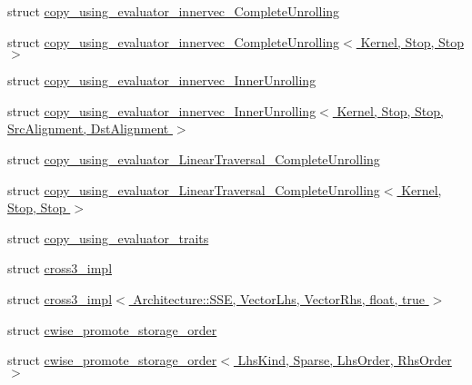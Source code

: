 \begin{DoxyCompactItemize}
\item 
struct \hyperlink{struct_eigen_1_1internal_1_1copy__using__evaluator__innervec___complete_unrolling}{copy\+\_\+using\+\_\+evaluator\+\_\+innervec\+\_\+\+Complete\+Unrolling}
\item 
struct \hyperlink{struct_eigen_1_1internal_1_1copy__using__evaluator__innervec___complete_unrolling_3_01_kernel_00_01_stop_00_01_stop_01_4}{copy\+\_\+using\+\_\+evaluator\+\_\+innervec\+\_\+\+Complete\+Unrolling$<$ Kernel, Stop, Stop $>$}
\item 
struct \hyperlink{struct_eigen_1_1internal_1_1copy__using__evaluator__innervec___inner_unrolling}{copy\+\_\+using\+\_\+evaluator\+\_\+innervec\+\_\+\+Inner\+Unrolling}
\item 
struct \hyperlink{struct_eigen_1_1internal_1_1copy__using__evaluator__innervec___inner_unrolling_3_01_kernel_00_01f9638de23111656da8d7300be7918511}{copy\+\_\+using\+\_\+evaluator\+\_\+innervec\+\_\+\+Inner\+Unrolling$<$ Kernel, Stop, Stop, Src\+Alignment, Dst\+Alignment $>$}
\item 
struct \hyperlink{struct_eigen_1_1internal_1_1copy__using__evaluator___linear_traversal___complete_unrolling}{copy\+\_\+using\+\_\+evaluator\+\_\+\+Linear\+Traversal\+\_\+\+Complete\+Unrolling}
\item 
struct \hyperlink{struct_eigen_1_1internal_1_1copy__using__evaluator___linear_traversal___complete_unrolling_3_01_c8b3cb7351f57cc3b8eaeb07b20f5de4}{copy\+\_\+using\+\_\+evaluator\+\_\+\+Linear\+Traversal\+\_\+\+Complete\+Unrolling$<$ Kernel, Stop, Stop $>$}
\item 
struct \hyperlink{struct_eigen_1_1internal_1_1copy__using__evaluator__traits}{copy\+\_\+using\+\_\+evaluator\+\_\+traits}
\item 
struct \hyperlink{struct_eigen_1_1internal_1_1cross3__impl}{cross3\+\_\+impl}
\item 
struct \hyperlink{struct_eigen_1_1internal_1_1cross3__impl_3_01_architecture_1_1_s_s_e_00_01_vector_lhs_00_01_vect981fca9d3c0a247b027e5ff23e43a093}{cross3\+\_\+impl$<$ Architecture\+::\+S\+S\+E, Vector\+Lhs, Vector\+Rhs, float, true $>$}
\item 
struct \hyperlink{struct_eigen_1_1internal_1_1cwise__promote__storage__order}{cwise\+\_\+promote\+\_\+storage\+\_\+order}
\item 
struct \hyperlink{struct_eigen_1_1internal_1_1cwise__promote__storage__order_3_01_lhs_kind_00_01_sparse_00_01_lhs_order_00_01_rhs_order_01_4}{cwise\+\_\+promote\+\_\+storage\+\_\+order$<$ Lhs\+Kind, Sparse, Lhs\+Order, Rhs\+Order $>$}

\end{DoxyCompactItemize}
